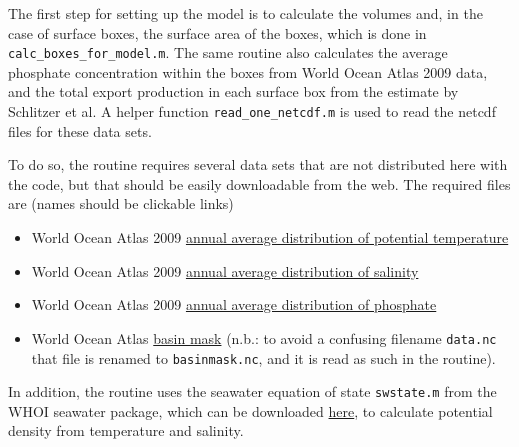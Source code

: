 \documentclass[a4paper,titlepage=false]{scrartcl}
\begin{document}
The first step for setting up the model is to calculate the volumes
and, in the case of surface boxes, the surface area of the boxes,
which is done in \verb+calc_boxes_for_model.m+. The same routine also
calculates the average phosphate concentration within the boxes from
World Ocean Atlas 2009 data, and the total export production in each
surface box from the estimate by Schlitzer et al.  A helper function
\verb+read_one_netcdf.m+ is used to read the netcdf files for these
data sets.

To do so, the routine requires several data sets that are not
distributed here with the code, but that should be easily downloadable
from the web. The required files are (names should be clickable links)
\begin{itemize}
\item World Ocean Atlas 2009
  \href{http://data.nodc.noaa.gov/thredds/fileServer/woa/WOA09/NetCDFdata/temperature_annual_1deg.nc}{annual
    average distribution of potential temperature} \citep{Locarnini10}
\item World Ocean Atlas 2009
  \href{http://data.nodc.noaa.gov/thredds/fileServer/woa/WOA09/NetCDFdata/salinity_annual_1deg.nc}{annual
    average distribution of salinity} \citep{Antonov10} 
\item World Ocean Atlas 2009
  \href{http://data.nodc.noaa.gov/thredds/fileServer/woa/WOA09/NetCDFdata/phosphate_annual_1deg.nc}{annual
    average distribution of phosphate} \citep{Garcia10}
\item World Ocean Atlas
  \href{http://iridl.ldeo.columbia.edu/SOURCES/.NOAA/.NODC/.WOA09/.Masks/.basin/data.nc}{basin
    mask} (n.b.: to avoid a confusing filename \verb+data.nc+ that
  file is renamed to \verb+basinmask.nc+, and it is read as such in
  the routine).
\end{itemize}
In addition, the routine uses the seawater equation of state
\verb+swstate.m+ from the WHOI seawater package, which can be downloaded
\href{http://mooring.ucsd.edu/software/matlab/doc/toolbox/ocean/swstate.html}{here},
to calculate potential density from temperature and salinity.
\end{document}
